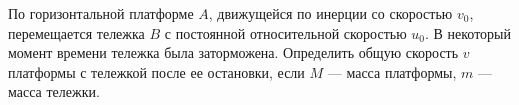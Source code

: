 По горизонтальной платформе $A$, движущейся по инерции со скоростью $v_{0}$, 
перемещается тележка $B$ с постоянной относительной скоростью $u_{0}$. В некоторый момент времени тележка была заторможена. Определить общую скорость $v$ платформы с тележкой после ее остановки, если $M$ --- масса платформы, 
$m$ --- масса тележки.
